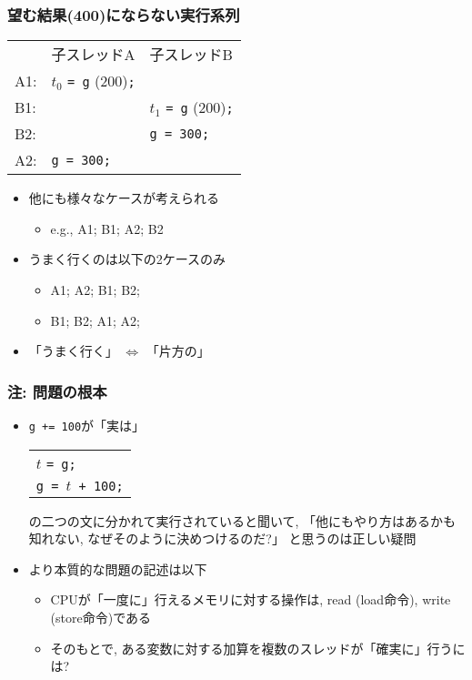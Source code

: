 \documentclass[12pt,dvipdfmx]{beamer}
\begin{document}
\begin{frame}
  \frametitle{望む結果(400)にならない実行系列}
  \begin{center}
\begin{tabular}{l|l|l}
    & 子スレッドA                   &  子スレッドB                   \\
A1: & $t_0$ {\tt = g} (200){\tt ;}  &                                \\
B1: &                               &  $t_1$ {\tt = g} (200){\tt ;}  \\
B2: &                               &  {\tt g = 300;}                \\
A2: &  {\tt g = 300;}               &                                \\
\end{tabular}
  \end{center}

\begin{itemize}
\item 他にも様々なケースが考えられる
  \begin{itemize}
  \item e.g., A1; B1; A2; B2
  \end{itemize}
\item うまく行くのは以下の2ケースのみ
  \begin{itemize}
  \item A1; A2; B1; B2;
  \item B1; B2; A1; A2;
  \end{itemize}

\item 「うまく行く」
  $\iff$ 「片方の」
\end{itemize}
\end{frame}

\begin{frame}
  \frametitle{注: 問題の根本}
  \begin{itemize}
  \item {\tt g += 100}が「実は」

    \begin{tabular}{l}
      $t$ {\tt = g;} \\
      {\tt g = $t$ + 100;} \\
    \end{tabular}

    の二つの文に分かれて実行されていると聞いて,
    「他にもやり方はあるかも知れない, なぜそのように決めつけるのだ?」
    と思うのは正しい疑問
    
  \item より本質的な問題の記述は以下
    \begin{itemize}
    \item CPUが「一度に」行えるメモリに対する操作は,  read (load命令),
      write (store命令)である
    \item そのもとで,
      ある変数に対する加算を複数のスレッドが「確実に」行うには?
    \end{itemize}
  \end{itemize}
\end{frame}
\end{document}
